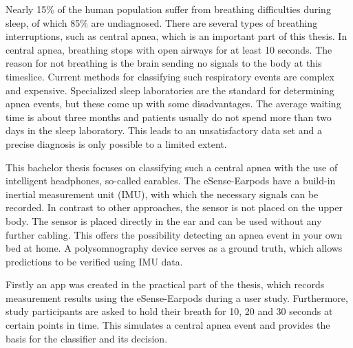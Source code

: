 Nearly 15\% of the human population suffer from breathing difficulties during sleep, of which 85\% are undiagnosed. 
There are several types of breathing interruptions, such as central apnea, which is an important part of this thesis. 
In central apnea, breathing stops with open airways for at least 10 seconds. 
The reason for not breathing is the brain sending no signals to the body at this timeslice.
Current methods for classifying such respiratory events are complex and expensive. 
Specialized sleep laboratories are the standard for determining apnea events, but these come up with some disadvantages. 
The average waiting time is about three months and patients usually do not spend more than two days in the sleep laboratory. 
This leads to an unsatisfactory data set and a precise diagnosis is only possible to a limited extent.

This bachelor thesis focuses on classifying such a central apnea with the use of intelligent headphones, so-called earables. 
The eSense-Earpods have a build-in inertial measurement unit (IMU), with which the necessary signals can be recorded. 
In contrast to other approaches, the sensor is not placed on the upper body.
The sensor is placed directly in the ear and can be used without any further cabling. 
This offers the possibility detecting an apnea event in your own bed at home. 
A polysomnography device serves as a ground truth, which allows predictions to be verified using IMU data. 

Firstly an app was created in the practical part of the thesis, which records measurement results using the eSense-Earpods during a user study. 
Furthermore, study participants are asked to hold their breath for 10, 20 and 30 seconds at certain points in time. 
This simulates a central apnea event and provides the basis for the classifier and its decision.


